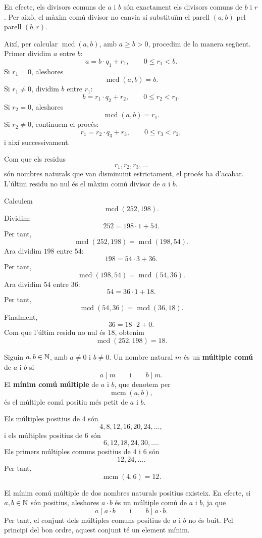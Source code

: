 En efecte, els divisors comuns de $a$ i $b$ són exactament els divisors comuns de $b$ i $r$. Per això, el màxim comú divisor no canvia si substituïm el parell $(a,b)$ pel parell $(b,r)$.

Així, per calcular $\operatorname{mcd}(a,b)$, amb $a\geq b>0$, procedim de la manera següent. Primer dividim $a$ entre $b$:
\[
a=b\cdot q_1+r_1,
\qquad 0\leq r_1<b.
\]
Si $r_1=0$, aleshores
\[
\operatorname{mcd}(a,b)=b.
\]
Si $r_1\neq 0$, dividim $b$ entre $r_1$:
\[
b=r_1\cdot q_2+r_2,
\qquad 0\leq r_2<r_1.
\]
Si $r_2=0$, aleshores
\[
\operatorname{mcd}(a,b)=r_1.
\]
Si $r_2\neq 0$, continuem el procés:
\[
r_1=r_2\cdot q_3+r_3,
\qquad 0\leq r_3<r_2,
\]
i així successivament.

Com que els residus
\[
r_1,r_2,r_3,\ldots
\]
són nombres naturals que van disminuint estrictament, el procés ha d'acabar. L'últim residu no nul és el màxim comú divisor de $a$ i $b$.

\begin{exemple}
Calculem
\[
\operatorname{mcd}(252,198).
\]
Dividim:
\[
252=198\cdot 1+54.
\]
Per tant,
\[
\operatorname{mcd}(252,198)=\operatorname{mcd}(198,54).
\]
Ara dividim $198$ entre $54$:
\[
198=54\cdot 3+36.
\]
Per tant,
\[
\operatorname{mcd}(198,54)=\operatorname{mcd}(54,36).
\]
Ara dividim $54$ entre $36$:
\[
54=36\cdot 1+18.
\]
Per tant,
\[
\operatorname{mcd}(54,36)=\operatorname{mcd}(36,18).
\]
Finalment,
\[
36=18\cdot 2+0.
\]
Com que l'últim residu no nul és $18$, obtenim
\[
\operatorname{mcd}(252,198)=18.
\]
\end{exemple}

\begin{definicio}
Siguin $a,b\in\mathbb{N}$, amb $a\neq 0$ i $b\neq 0$. Un nombre natural $m$ és un \textbf{múltiple comú} de $a$ i $b$ si
\[
a\mid m
\qquad\text{i}\qquad
b\mid m.
\]
El \textbf{mínim comú múltiple} de $a$ i $b$, que denotem per
\[
\operatorname{mcm}(a,b),
\]
és el múltiple comú positiu més petit de $a$ i $b$.
\end{definicio}

\begin{exemple}
Els múltiples positius de $4$ són
\[
4,8,12,16,20,24,\ldots,
\]
i els múltiples positius de $6$ són
\[
6,12,18,24,30,\ldots.
\]
Els primers múltiples comuns positius de $4$ i $6$ són
\[
12,24,\ldots.
\]
Per tant,
\[
\operatorname{mcm}(4,6)=12.
\]
\end{exemple}

\begin{observacio}
El mínim comú múltiple de dos nombres naturals positius existeix. En efecte, si $a,b\in\mathbb{N}$ són positius, aleshores $a\cdot b$ és un múltiple comú de $a$ i $b$, ja que
\[
a\mid a\cdot b
\qquad\text{i}\qquad
b\mid a\cdot b.
\]
Per tant, el conjunt dels múltiples comuns positius de $a$ i $b$ no és buit. Pel principi del bon ordre, aquest conjunt té un element mínim.
\end{observacio}

